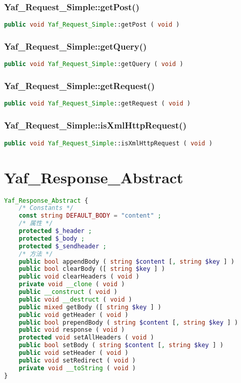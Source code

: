 \subsection{Yaf\_Request\_Simple::getPost()}


\begin{lstlisting}[language=PHP]
public void Yaf_Request_Simple::getPost ( void )
\end{lstlisting}

\subsection{Yaf\_Request\_Simple::getQuery()}


\begin{lstlisting}[language=PHP]
public void Yaf_Request_Simple::getQuery ( void )
\end{lstlisting}


\subsection{Yaf\_Request\_Simple::getRequest()}


\begin{lstlisting}[language=PHP]
public void Yaf_Request_Simple::getRequest ( void )
\end{lstlisting}

\subsection{Yaf\_Request\_Simple::isXmlHttpRequest()}


\begin{lstlisting}[language=PHP]
public void Yaf_Request_Simple::isXmlHttpRequest ( void )
\end{lstlisting}

\chapter{Yaf\_Response\_Abstract}




\begin{lstlisting}[language=PHP]
Yaf_Response_Abstract {
    /* Constants */
    const string DEFAULT_BODY = "content" ;
    /* 属性 */
    protected $_header ;
    protected $_body ;
    protected $_sendheader ;
    /* 方法 */
    public bool appendBody ( string $content [, string $key ] )
    public bool clearBody ([ string $key ] )
    public void clearHeaders ( void )
    private void __clone ( void )
    public __construct ( void )
    public void __destruct ( void )
    public mixed getBody ([ string $key ] )
    public void getHeader ( void )
    public bool prependBody ( string $content [, string $key ] )
    public void response ( void )
    protected void setAllHeaders ( void )
    public bool setBody ( string $content [, string $key ] )
    public void setHeader ( void )
    public void setRedirect ( void )
    private void __toString ( void )
}
\end{lstlisting}

